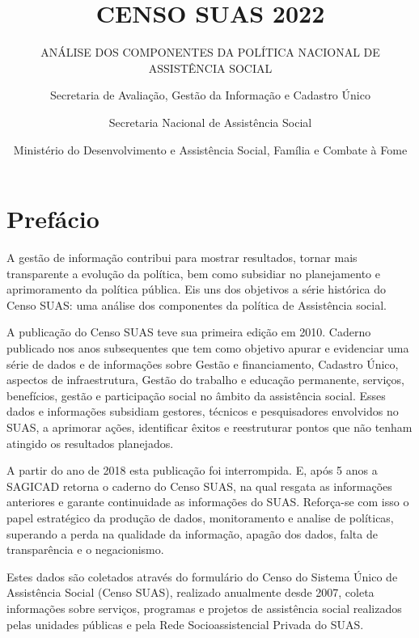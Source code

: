 \documentclass[
  brazilian]{report}
\title{CENSO SUAS 2022}
\subtitle{ANÁLISE DOS COMPONENTES DA POLÍTICA NACIONAL DE ASSISTÊNCIA
SOCIAL}
\author{Secretaria de Avaliação, Gestão da Informação e Cadastro
Único \and Secretaria Nacional de Assistência Social \and Ministério do
Desenvolvimento e Assistência Social, Família e Combate à Fome}
\date{}
\begin{document}
\maketitle

\renewcommand{\figurename}{Gráfico}

\captionsetup[figure]{labelfont=bf,textfont=bf}
\captionsetup[table]{labelfont=bf,textfont=bf}
\newcommand\fnote[1]{\captionsetup{font=small, textfont=normalfont}\caption*{#1}}
\captionsetup{justification=raggedright,singlelinecheck=false}

\hypertarget{prefuxe1cio}{%
\chapter*{Prefácio}\label{prefuxe1cio}}

A gestão de informação contribui para mostrar resultados, tornar mais
transparente a evolução da política, bem como subsidiar no planejamento
e aprimoramento da política pública. Eis uns dos objetivos a série
histórica do Censo SUAS: uma análise dos componentes da política de
Assistência social.

A publicação do Censo SUAS teve sua primeira edição em 2010. Caderno
publicado nos anos subsequentes que tem como objetivo apurar e
evidenciar uma série de dados e de informações sobre Gestão e
financiamento, Cadastro Único, aspectos de infraestrutura, Gestão do
trabalho e educação permanente, serviços, benefícios, gestão e
participação social no âmbito da assistência social. Esses dados e
informações subsidiam gestores, técnicos e pesquisadores envolvidos no
SUAS, a aprimorar ações, identificar êxitos e reestruturar pontos que
não tenham atingido os resultados planejados.

A partir do ano de 2018 esta publicação foi interrompida. E, após 5 anos
a SAGICAD retorna o caderno do Censo SUAS, na qual resgata as
informações anteriores e garante continuidade as informações do SUAS.
Reforça-se com isso o papel estratégico da produção de dados,
monitoramento e analise de políticas, superando a perda na qualidade da
informação, apagão dos dados, falta de transparência e o negacionismo.

Estes dados são coletados através do formulário do Censo do Sistema
Único de Assistência Social (Censo SUAS), realizado anualmente desde
2007, coleta informações sobre serviços, programas e projetos de
assistência social realizados pelas unidades públicas e pela Rede
Socioassistencial Privada do SUAS.
\end{document}
